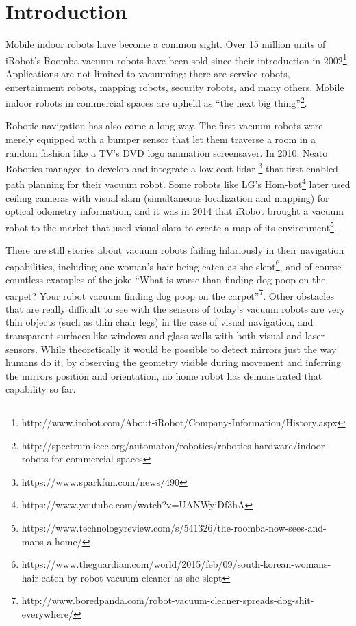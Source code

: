 \chapter{Introduction}\label{introduction}

Mobile indoor robots have become a common sight. Over 15 million units
of iRobot's Roomba vacuum robots have been sold since their introduction
in 2002\footnote{http://www.irobot.com/About-iRobot/Company-Information/History.aspx}.
Applications are not limited to vacuuming: there are service robots,
entertainment robots, mapping robots, security robots, and many others.
Mobile indoor robots in commercial spaces are upheld as ``the next big
thing''\footnote{http://spectrum.ieee.org/automaton/robotics/robotics-hardware/indoor-robots-for-commercial-spaces}.

Robotic navigation has also come a long way. The first vacuum robots
were merely equipped with a bumper sensor that let them traverse a
room in a random fashion like a TV's DVD logo animation screensaver. In 2010, Neato Robotics
managed to develop and integrate a low-cost lidar
\footnote{https://www.sparkfun.com/news/490} that first enabled path
planning for their vacuum robot. Some robots like LG's
Hom-bot\footnote{https://www.youtube.com/watch?v=UANWyiDf3hA} later used
ceiling cameras with visual slam (simultaneous localization and mapping)
for optical odometry information, and it was in 2014 that iRobot
brought a vacuum robot to the market that used visual slam to create a
map of its environment\footnote{https://www.technologyreview.com/s/541326/the-roomba-now-sees-and-maps-a-home/}.

There are still stories about vacuum robots failing hilariously in their
navigation capabilities, including one woman's hair being eaten as she
slept\footnote{https://www.theguardian.com/world/2015/feb/09/south-korean-womans-hair-eaten-by-robot-vacuum-cleaner-as-she-slept},
and of course countless examples of the joke ``What is worse than
finding dog poop on the carpet? Your robot vacuum finding dog poop on
the carpet''\footnote{http://www.boredpanda.com/robot-vacuum-cleaner-spreads-dog-shit-everywhere/}.
Other obstacles that are really difficult to see with the sensors of
today's vacuum robots are very thin objects (such as thin chair legs) in
the case of visual navigation, and transparent surfaces like windows and
glass walls with both visual and laser sensors. While theoretically it
would be possible to detect mirrors just the way humans do it, by
observing the geometry visible during movement and inferring the mirrors
position and orientation, no home robot has demonstrated that capability
so far.


